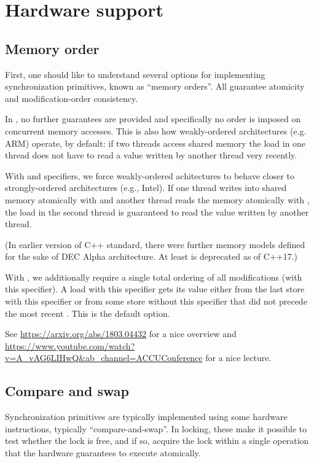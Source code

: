 \section{Hardware support}

\subsection{Memory order}

First, one should like to understand several options for implementing synchronization primitives, known as ``memory orders''.
All guarantee atomicity and modification-order consistency.

In , no further guarantees are provided and specifically no order is imposed on concurrent memory accesses. This is also how weakly-ordered architectures (e.g. ARM) operate, by default: if two threads access shared memory the load in one thread does not have to read a value written by another thread very recently.

With  and  specifiers, we force  weakly-ordered achitectures to behave closer to strongly-ordered architectures (e.g., Intel). If one thread writes into shared memory atomically with  and another thread reads the memory atomically with , the load in the second thread is guaranteed to read the value written by another thread. 

(In earlier version of C++ standard, there were further memory models defined for the sake of DEC Alpha architecture. At least  is deprecated as of C++17.) 

With , we additionally require a single total ordering of all modifications (with this specifier). A load with this specifier gets its value either from the last store with this specifier or from some store without this specifier that did not precede the most recent . This is the default option. 

See \url{https://arxiv.org/abs/1803.04432} for a nice overview and \url{https://www.youtube.com/watch?v=A_vAG6LIHwQ&ab_channel=ACCUConference} for a nice lecture. 

\subsection{Compare and swap}

Synchronization primitives are typically implemented using some hardware instructions, typically ``compare-and-swap''. In locking, these make it possible to test whether the lock is free, and if so, acquire the lock within a single operation that the hardware guarantees to execute atomically.

